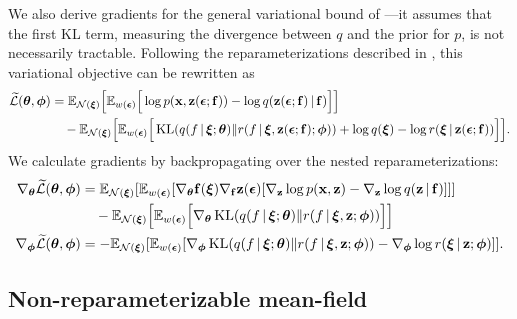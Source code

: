 We also derive gradients for the general variational bound of
---it assumes that the first KL term,
measuring the divergence between $q$ and the prior for $p$, is not
necessarily tractable.
Following the reparameterizations described in ,
this variational objective can be rewritten as
\begin{align*}
\widetilde{\cL}(\mbtheta, \mbphi)
&=
\mathbb{E}_{\mathcal{N}(\mbxi)}\Big[\mathbb{E}_{w(\mbepsilon)}\Big[
\log p(\mbx,\mbz(\mbepsilon;\f)) - \log
q(\mbz(\mbepsilon;\f)\g\f)
\Big]\Big]
\\
&\quad
-
\mathbb{E}_{\mathcal{N}(\mbxi)}\Big[\mathbb{E}_{w(\mbepsilon)}\Big[
\operatorname{KL}(q(f\g\mbxi;\mbtheta)\|r(f\g\mbxi,\mbz(\mbepsilon;\f);\mbphi))
+
\log q(\mbxi) - \log r(\mbxi\g\mbz(\mbepsilon;\f))
\Big]\Big]
.
\end{align*}
We calculate gradients by backpropagating over the nested
reparameterizations:
\begin{align*}
\nabla_{\mbtheta}
\widetilde{\cL}(\mbtheta, \mbphi)
&=
\mathbb{E}_{\mathcal{N}(\mbxi)}[
\mathbb{E}_{w(\mbepsilon)}[
\nabla_{\mbtheta} \f(\mbxi)
\nabla_{\f} \mbz(\mbepsilon)[\nabla_{\mbz}\log p(\mbx,\mbz) - \nabla_{\mbz}\log q(\mbz\g\f)]]]
\\
&\quad
-
\mathbb{E}_{\mathcal{N}(\mbxi)}\Big[\mathbb{E}_{w(\mbepsilon)}\Big[
\nabla_{\mbtheta}
\operatorname{KL}(q(f\g\mbxi;\mbtheta)\|r(f\g\mbxi,\mbz;\mbphi))
\Big]\Big]
\\
\nabla_{\mbphi}
\widetilde{\cL}(\mbtheta, \mbphi)
&=
-
\mathbb{E}_{\mathcal{N}(\mbxi)}[\mathbb{E}_{w(\mbepsilon)}[
\nabla_{\mbphi}
\operatorname{KL}(q(f\g\mbxi;\mbtheta)\|r(f\g\mbxi,\mbz;\mbphi))
-
\nabla_{\mbphi}
\log r(\mbxi\g\mbz; \mbphi)
]
]
.
\end{align*}

\subsection{Non-reparameterizable mean-field}

